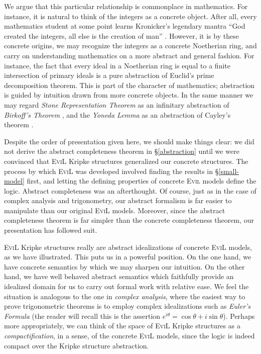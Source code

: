 We argue that this particular relationship is commonplace in
mathematics.  For instance, it is natural to think of the integers as
a concrete object.  After all, every mathematics student at some point
learns Kronicker's legendary mantra ``God created the integers, all
else is the creation of man'' \cite[pg. 477]{bell_men_1986}.
However, it is by these concrete origins, we may recognize the
integers as a concrete Noetherian ring, and carry on understanding
mathematics on a more abstract and general fashion.
  For instance, the fact that every ideal in a Noetherian ring is equal to a finite
intersection of primary ideals is a pure abstraction of 
Euclid's prime decomposition theorem\cite[Lemmas 7.11 and 7.12,
pg. 83]{atiyah_introduction_1994}.  This is part of the character of
mathematics; abstraction is guided by intuition drawn from more
concrete objects.  In  the same manner we may regard \emph{Stone
Representation Theorem} as an infinitary abstraction of
\emph{Birkoff's Theorem} \cite[chapters 11 and 5,
respectively]{davey_introduction_2002}, and the \emph{Yoneda Lemma} as
an abstraction of Cayley's
theorem \cite[chapters 4 and 1, respectively]{smith_post-modern_1999}.

Despite the order of presentation given here, we should make things
clear: we did not derive the abstract completeness theorem in
\S\ref{abstraction} until we were convinced that \textsc{EviL} Kripke
structures generalized our concrete structures.  The process by which
\textsc{EviL} was developed involved finding the results in
\S\ref{small-model} first, and letting the defining properties of
concrete \textsc{Evil} models define the logic.  
Abstract completeness was an afterthought.  Of course, just as in the
case of complex analysis and trigonometry, our abstract formalism
is far easier to manipulate than our original \textsc{EviL} models.
Moreover, since the abstract completeness theorem is far simpler than
the concrete completeness theorem, our presentation has followed suit.

\textsc{EviL} Kripke structures really are abstract
idealizations of concrete \textsc{EviL} models, as we have
illustrated.  This puts us in a powerful position. 
On the one hand, we have concrete semantics by
which we may sharpen our intuition. On the other hand, we 
have well behaved abstract semantics which faithfully provide an 
idealized domain for us to carry out formal work with relative ease.
We feel the situation is analogous to the one in \emph{complex analysis}, where
the easiest way to prove trigonometric theorems is to employ complex
idealizations such as \emph{Euler's Formula} (the reader will recall this is
the assertion $e^{i \theta} = \cos \theta + i \sin \theta$).  Perhaps
more appropriately, we can think of the space of \textsc{EviL}
Kripke structures as a \emph{compactification}, in a sense, of the
concrete \textsc{EviL} models, since the logic is indeed compact over
the Kripke structure abstraction.

